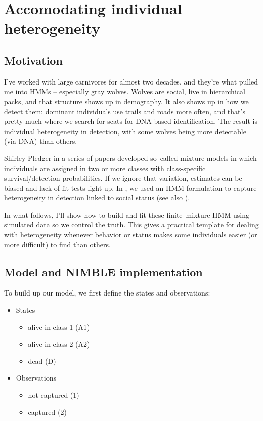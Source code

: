 \documentclass[
  12pt,
]{krantz}
\providecommand{\tightlist}{%
  \setlength{\itemsep}{0pt}\setlength{\parskip}{0pt}}
\begin{document}
\section{Accomodating individual heterogeneity}\label{accomodating-individual-heterogeneity}

\subsection{Motivation}\label{motivation-5}

I've worked with large carnivores for almost two decades, and they're what pulled me into HMMs -- especially gray wolves. Wolves are social, live in hierarchical packs, and that structure shows up in demography. It also shows up in how we detect them: dominant individuals use trails and roads more often, and that's pretty much where we search for scats for DNA-based identification. The result is individual heterogeneity in detection, with some wolves being more detectable (via DNA) than others.

Shirley Pledger in a series of papers developed so--called mixture models in which individuals are assigned in two or more classes with class-specific survival/detection probabilities. If we ignore that variation, estimates can be biased and lack-of-fit tests light up. In \citet{cubaynes_importance_2010}, we used an HMM formulation to capture heterogeneity in detection linked to social status (see also \citet{pradel2009}).

In what follows, I'll show how to build and fit these finite--mixture HMM using simulated data so we control the truth. This gives a practical template for dealing with heterogeneity whenever behavior or status makes some individuals easier (or more difficult) to find than others.

\subsection{Model and NIMBLE implementation}\label{model-and-nimble-implementation-5}

To build up our model, we first define the states and observations:

\begin{itemize}
\tightlist
\item
  States

  \begin{itemize}
  \tightlist
  \item
    alive in class 1 (A1)
  \item
    alive in class 2 (A2)
  \item
    dead (D)
  \end{itemize}
\item
  Observations

  \begin{itemize}
  \tightlist
  \item
    not captured (1)
  \item
    captured (2)
  \end{itemize}
\end{itemize}
\end{document}

